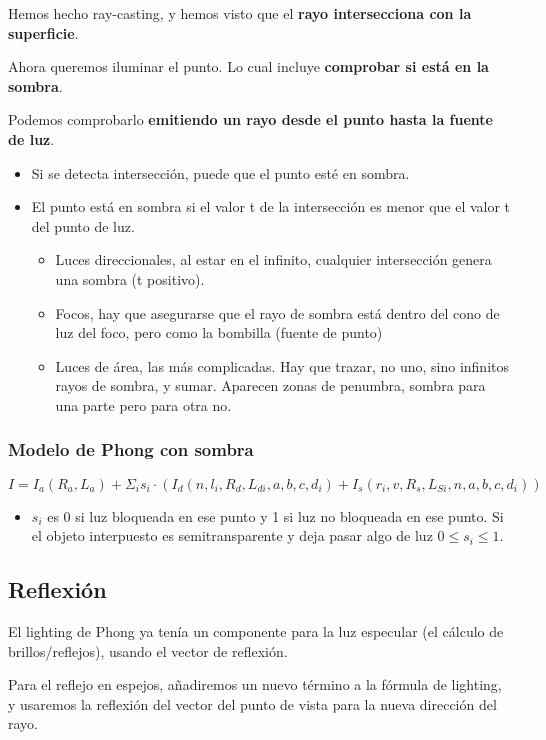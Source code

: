 Hemos hecho ray-casting, y hemos visto que el \textbf{rayo intersecciona con la superficie}.

Ahora queremos iluminar el punto. Lo cual incluye \textbf{comprobar si está en la sombra}.

Podemos comprobarlo \textbf{emitiendo un rayo desde el punto hasta la fuente de luz}.
\begin{itemize}
    \item Si se detecta intersección, puede que el punto esté en sombra.
    \item El punto está en sombra si el valor t de la intersección es menor que el valor t del punto de luz.
    \begin{itemize}
        \item Luces direccionales, al estar en el infinito, cualquier intersección genera una sombra (t positivo).
        \item Focos, hay que asegurarse que el rayo de sombra está dentro del cono de luz del foco, pero como la bombilla (fuente de punto)
        \item Luces de área, las más complicadas. Hay que trazar, no uno, sino infinitos rayos de sombra, y sumar. Aparecen zonas de penumbra, sombra para una parte pero para otra no.
    \end{itemize}
\end{itemize}

\subsubsection{Modelo de Phong con sombra} 
$I=I_a(R_a,L_a)+\Sigma_i s_i \cdot (I_d(n, l_i, R_d, L_{di}, a, b, c, d_i)+I_s(r_i,v, R_s, L_{Si}, n, a, b, c, d_i))$
\begin{itemize}
    \item $s_i$ es 0 si luz bloqueada en ese punto y 1 si luz no bloqueada en ese punto. Si el objeto interpuesto es semitransparente y deja pasar algo de luz $0 \leq s_i \leq 1$.
\end{itemize}

\subsection{Reflexión}
El lighting de Phong ya tenía un componente para la luz especular (el cálculo de brillos/reflejos), usando el vector de reflexión.

Para el reflejo en espejos, añadiremos un nuevo término a la fórmula de lighting, y usaremos la reflexión del vector del punto de vista para la nueva dirección del rayo.

